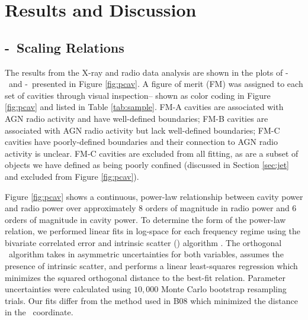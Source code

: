 \documentclass{emulateapj}
\begin{document}
\section{Results and Discussion}
\label{sec:r&d}

\subsection{\pjet-\prad\ Scaling Relations}
\label{sec:relation}

The results from the X-ray and radio data analysis are shown in the
plots of \pcav-\phigh\ and \pcav-\plow\ presented in Figure
\ref{fig:pcav}. A figure of merit (FM) was assigned to each set of
cavities through visual inspection-- shown as color coding in Figure
\ref{fig:pcav} and listed in Table \ref{tab:sample}. FM-A cavities are
associated with AGN radio activity and have well-defined boundaries;
FM-B cavities are associated with AGN radio activity but lack
well-defined boundaries; FM-C cavities have poorly-defined boundaries
and their connection to AGN radio activity is unclear. FM-C cavities
are excluded from all fitting, as are a subset of objects we have
defined as being poorly confined (discussed in Section \ref{sec:jet}
and excluded from Figure \ref{fig:pcav}).

Figure \ref{fig:pcav} shows a continuous, power-law relationship
between cavity power and radio power over approximately 8 orders of
magnitude in radio power and 6 orders of magnitude in cavity power. To
determine the form of the power-law relation, we performed linear fits
in log-space for each frequency regime using the bivariate correlated
error and intrinsic scatter (\bces) algorithm \citep{bces}. The
orthogonal \bces\ algorithm takes in asymmetric uncertainties for both
variables, assumes the presence of intrinsic scatter, and performs a
linear least-squares regression which minimizes the squared orthogonal
distance to the best-fit relation. Parameter uncertainties were
calculated using $10,000$ Monte Carlo bootstrap resampling trials. Our
fits differ from the method used in B08 which minimized the distance
in the \pcav\ coordinate.
\end{document}
